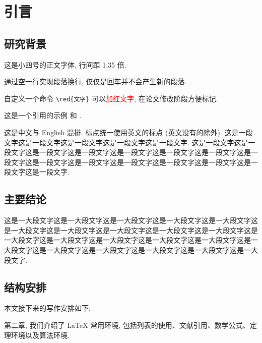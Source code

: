 \documentclass[openany,twoside,12pt]{book}
\makeatletter
\renewcommand{\cleardoublepage}{\clearpage
  \clearpage\if@twoside\ifodd\c@page\else%
  \thispagestyle{empty}%
  \hbox{}\newpage\if@twocolumn\hbox{}\newpage\fi\fi\fi%
}
\theoremstyle{plain}
\renewcommand{\contentsname}{目~~录}
\newcommand{\red}[1]{\textcolor{red}{#1}}
\makeatother
\begin{document}

\renewcommand\contentsname{目~~录}
\cleardoublepage
{}
\pdfbookmark[chapter]{\contentsname}{toc}
\tableofcontents



\mainmatter   %



\chapter{引言}

\section{研究背景}

这是小四号的正文字体, 行间距 1.35 倍.

通过空一行实现段落换行, 仅仅是回车并不会产生新的段落.

自定义一个命令 \verb|\red{文字}| 可以\red{加红文字}, 在论文修改阶段方便标记.

这是一个引用的示例 \cite{Tadmor2012} 和 \cite{LiLiu1997,Adams2003,TreWei2014}.

这是中文与 English 混排. 标点统一使用英文的标点 (英文没有的除外). 这是一段文字这是一段文字这是一段文字这是一段文字这是一段文字. 这是一段文字这是一段文字这是一段文字这是一段文字这是一段文字这是一段文字这是一段文字这是一段文字这是一段文字这是一段文字这是一段文字这是一段文字这是一段文字这是一段文字这是一段文字.

\section{主要结论}

这是一大段文字这是一大段文字这是一大段文字这是一大段文字这是一大段文字这是一大段文字这是一大段文字这是一大段文字这是一大段文字这是一大段文字这是一大段文字这是一大段文字这是一大段文字这是一大段文字这是一大段文字这是一大段文字这是一大段文字这是一大段文字这是一大段文字这是一大段文字这是一大段文字.


\section{结构安排}

本文接下来的写作安排如下:

第二章, 我们介绍了 LaTeX 常用环境, 包括列表的使用、文献引用、数学公式、定理环境以及算法环境.
\end{document}
